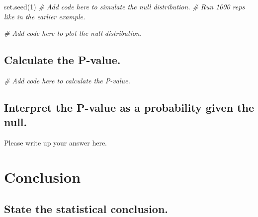 \documentclass[
]{book}
\newenvironment{Shaded}{\begin{snugshade}}{\end{snugshade}}
\newcommand{\CommentTok}[1]{\textcolor[rgb]{0.56,0.35,0.01}{\textit{#1}}}
\newcommand{\DecValTok}[1]{\textcolor[rgb]{0.00,0.00,0.81}{#1}}
\newcommand{\FunctionTok}[1]{\textcolor[rgb]{0.00,0.00,0.00}{#1}}
\newcommand{\NormalTok}[1]{#1}
\begin{document}
\begin{Shaded}
\begin{Highlighting}[]
\FunctionTok{set.seed}\NormalTok{(}\DecValTok{1}\NormalTok{)}
\CommentTok{\# Add code here to simulate the null distribution.}
\CommentTok{\# Run 1000 reps like in the earlier example.}
\end{Highlighting}
\end{Shaded}

\begin{Shaded}
\begin{Highlighting}[]
\CommentTok{\# Add code here to plot the null distribution.}
\end{Highlighting}
\end{Shaded}

\hypertarget{calculate-the-p-value.-2}{%
\subsection*{Calculate the P-value.}\label{calculate-the-p-value.-2}}

\begin{Shaded}
\begin{Highlighting}[]
\CommentTok{\# Add code here to calculate the P{-}value.}
\end{Highlighting}
\end{Shaded}

\hypertarget{interpret-the-p-value-as-a-probability-given-the-null.-2}{%
\subsection*{Interpret the P-value as a probability given the null.}\label{interpret-the-p-value-as-a-probability-given-the-null.-2}}

Please write up your answer here.

\hypertarget{conclusion-2}{%
\section*{Conclusion}\label{conclusion-2}}

\hypertarget{state-the-statistical-conclusion.-2}{%
\subsection*{State the statistical conclusion.}\label{state-the-statistical-conclusion.-2}}
\end{document}
